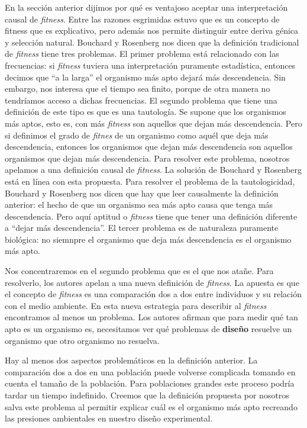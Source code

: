 En la sección anterior dijimos por qué es ventajoso aceptar una interpretación causal de \emph{fitness}. Entre las razones esgrimidas estuvo que es un concepto de fitness que es explicativo, pero además nos permite distinguir entre deriva génica y selección natural. Bouchard y Rosenberg \cite{Bouchard2004} nos dicen que la definición tradicional de \emph{fitness} tiene tres problemas. El primer problema está relacionado con las frecuencias: si \emph{fitness} tuviera una interpretación puramente estadística, entonces decimos que ``a la larga'' el organismo más apto dejará más descendencia. Sin embargo, nos interesa que el tiempo sea finito, porque de otra manera no tendríamos acceso a dichas frecuencias. El segundo problema que tiene una definición de este tipo es que es una tautología. Se supone que los organismos más aptos, esto es, con más \emph{fitness} son aquellos que dejan más descendencia. Pero si definimos el grado de \emph{fitnes} de un organismo como aquél que deja más descendencia, entonces los organismos que dejan más descendencia son aquellos organismos que dejan más descendencia. Para resolver este problema, nosotros apelamos a una definición causal de \emph{fitness}. La solución de Bouchard y Rosenberg está en línea con esta propuesta. Para resolver el problema de la tautologicidad, %
Bouchard y Rosenberg nos dicen que hay que leer causalmente la definición anterior: el hecho de que un organismo sea más apto causa que tenga más descendencia. Pero aquí aptitud o \emph{fitness} tiene que tener una definición diferente a ``dejar más descendencia''. El tercer problema es de naturaleza puramente biológica: no siemnpre el organismo que deja más descendencia es el organismo más apto.

Nos concentraremos en el segundo problema que es el que nos atañe. Para resolverlo, los autores apelan a una nueva definición de \emph{fitness}. La apuesta es que el concepto de \emph{fitness} es una comparación dos a dos entre individuos y su relación con el medio ambiente. En esta nueva estrategia para describir al \emph{fitness} encontramos al menos un problema. Los autores afirman que para medir qué tan apto es un organismo es, necesitamos ver qué problemas de \textbf{diseño} resuelve un organismo que otro organismo no resuelva.

Hay al menos dos aspectos problemáticos en la definición anterior. La comparación dos a dos en una población puede volverse complicada tomando en cuenta el tamaño de la población. Para poblaciones grandes este proceso podría tardar un tiempo indefinido. %
Creemos que la definición propuesta por nosotros salva este problema al permitir explicar cuál es el organismo más apto recreando las presiones ambientales en nuestro diseño experimental.

